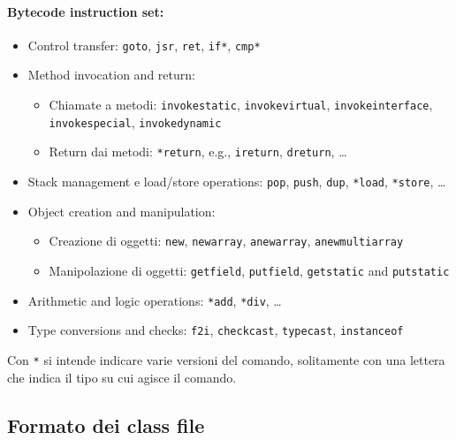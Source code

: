 \paragraph{Bytecode instruction set:}
\begin{itemize}
    \item Control transfer: \texttt{goto}, \texttt{jsr}, \texttt{ret}, \texttt{if*}, \texttt{cmp*}

    \item Method invocation and return:
    \begin{itemize}
        \item Chiamate a metodi: \texttt{invokestatic}, \texttt{invokevirtual}, \texttt{invokeinterface}, \texttt{invokespecial}, \texttt{invokedynamic}

        \item Return dai metodi: \texttt{*return}, e.g., \texttt{ireturn}, \texttt{dreturn}, \dots
    \end{itemize}

    \item Stack management e load/store operations: \texttt{pop}, \texttt{push}, \texttt{dup}, \texttt{*load}, \texttt{*store}, \dots

    \item Object creation and manipulation:
    \begin{itemize}
        \item Creazione di oggetti: \texttt{new}, \texttt{newarray}, \texttt{anewarray}, \texttt{anewmultiarray}

        \item Manipolazione di oggetti: \texttt{getfield}, \texttt{putfield}, \texttt{getstatic} and \texttt{putstatic}
    \end{itemize}

    \item Arithmetic and logic operations: \texttt{*add}, \texttt{*div}, \dots

    \item Type conversions and checks: \texttt{f2i}, \texttt{checkcast}, \texttt{typecast}, \texttt{instanceof}
\end{itemize}

Con \texttt{*} si intende indicare varie versioni del comando, solitamente con una lettera che indica il tipo su cui agisce il comando.

\subsection{Formato dei class file}
\label{subsec:classfile}

